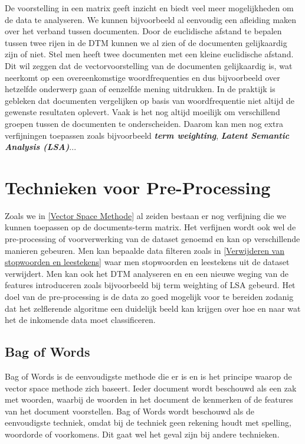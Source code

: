 %
De voorstelling in een matrix geeft inzicht en biedt veel meer mogelijkheden om de data te analyseren. We kunnen bijvoorbeeld al eenvoudig een afleiding maken over het verband tussen documenten.
Door de euclidische afstand te bepalen tussen twee rijen in de DTM kunnen we al zien of de documenten gelijkaardig zijn of niet. Stel men heeft twee documenten met een kleine euclidische afstand. Dit wil zeggen dat de vectorvoorstelling van de documenten gelijkaardig is, wat neerkomt op een overeenkomstige woordfrequenties en dus bijvoorbeeld over hetzelfde onderwerp gaan of eenzelfde mening uitdrukken.
%
In de praktijk is gebleken dat documenten vergelijken op basis van woordfrequentie niet altijd de gewenste resultaten oplevert. Vaak is het nog altijd moeilijk om verschillend groepen tussen de documenten te onderscheiden. Daarom kan men nog extra verfijningen toepassen zoals bijvoorbeeld \textbf{\textit{term weighting}}, \textbf{\textit{Latent Semantic Analysis (LSA)}}...


\section{Technieken voor Pre-Processing}\label{Technieken voor Pre-Processing}

Zoals we in \ref{Vector Space Methode}  al zeiden bestaan er nog verfijning die we kunnen toepassen op de documents-term matrix. Het verfijnen wordt ook wel de pre-processing of voorverwerking van de dataset genoemd en kan op verschillende manieren gebeuren. Men kan bepaalde data filteren zoals in \ref{Verwijderen van stopwoorden en leestekens} waar men stopwoorden en leestekens uit de dataset verwijdert. Men kan ook het DTM analyseren en en een nieuwe weging van de features introduceren zoals bijvoorbeeld bij term weighting of LSA gebeurd. Het doel van de pre-processing is de data zo goed mogelijk voor te bereiden zodanig dat het zelflerende algoritme een duidelijk beeld kan krijgen over hoe en naar wat het de inkomende data moet classificeren.

\subsection{Bag of Words}\label{Bag of Words}

Bag of Words is de eenvoudigste methode die er is en is het principe waarop de vector space methode zich baseert. Ieder document wordt beschouwd als een zak met woorden, waarbij de woorden in het document de kenmerken of de features van het document voorstellen. Bag of Words wordt beschouwd als de eenvoudigste techniek, omdat bij de techniek geen rekening houdt met spelling, woordorde of voorkomens. Dit gaat wel het geval zijn bij andere technieken.

